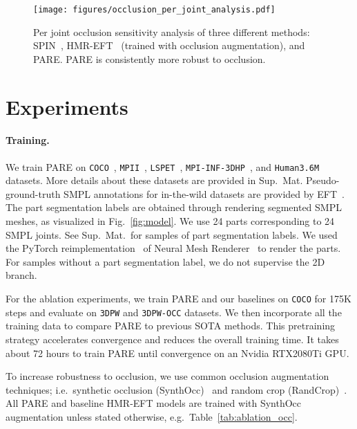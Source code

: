 \documentclass[10pt,twocolumn,letterpaper,usenames,dvipsnames]{article}
\newcommand{\methodname}{PARE\xspace}
\newcommand{\mpi}{\texttt{MPI-INF-3DHP}\xspace}
\newcommand{\mpii}{\texttt{MPII}\xspace}
\newcommand{\lspet}{\texttt{LSPET}\xspace}
\newcommand{\hthreesixm}{\texttt{Human3.6M}\xspace}
\newcommand{\threedpw}{\texttt{3DPW}\xspace}
\newcommand{\threedpwocc}{\texttt{3DPW-OCC}\xspace}
\newcommand{\coco}{\texttt{COCO}\xspace}
\newcommand{\supmat}{Sup.~Mat.\xspace}
\renewcommand{\ie}{i.e.\xspace}
\renewcommand{\eg}{e.g.\xspace}
\begin{document}
\begin{figure}[t]
	\centering
	\texttt{[image: figures/occlusion\_per\_joint\_analysis.pdf]}
	\vspace{-0.1in}
	\caption{Per joint occlusion sensitivity analysis of three different methods: SPIN~\cite{SPIN:ICCV:2019}, HMR-EFT~\cite{joo2020eft} (trained with occlusion augmentation), and PARE. PARE is consistently more robust to occlusion.}
	\label{fig:occ_analysis}
	\vspace{-2ex}
\end{figure}{}

\section{Experiments}
\label{experiments}


\paragraph{Training.} 
We train \methodname on \coco~\cite{coco}, \mpii~\cite{mpii}, \lspet~\cite{lspet}, \mpi~\cite{mpiiinf3dhp_mono-2017}, and \hthreesixm~\cite{ionescu_h36m} datasets. More details about these datasets are provided in \supmat Pseudo-ground-truth SMPL annotations for in-the-wild datasets are provided by EFT~\cite{joo2020eft}. 
The part segmentation labels are obtained through rendering segmented SMPL meshes, as visualized in Fig.~\ref{fig:model}. We use 24 parts corresponding to 24 SMPL joints. See \supmat~for samples of part segmentation labels. We used the PyTorch reimplementation~\cite{kolotouros2018pytorch} of Neural Mesh Renderer~\cite{kato2018renderer} to render the parts. For samples without a part segmentation label, we do not supervise the 2D branch.

For the ablation experiments, we train PARE and our baselines on \coco for 175K steps and evaluate on \threedpw and \threedpwocc datasets. We then incorporate all the training data to compare PARE to previous SOTA methods. This pretraining strategy accelerates convergence and reduces the overall training time. It takes about 72 hours to train PARE until convergence on an Nvidia RTX2080Ti GPU. 

To increase robustness to occlusion, we use common occlusion augmentation techniques; \ie~synthetic occlusion (SynthOcc)~\cite{sarandi2018robust} and random crop (RandCrop)~\cite{joo2020eft, Rockwell2020}. All PARE and baseline HMR-EFT models are trained with SynthOcc augmentation unless stated otherwise, \eg~Table~\ref{tab:ablation_occ}.
\end{document}
